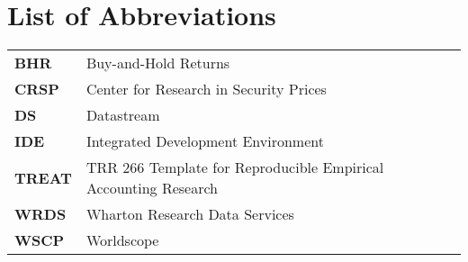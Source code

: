 \clearpage
{}
\section*{List of Abbreviations}
\setlength{\parindent}{0em}
\setcounter{page}{4}

\begin{tabular}{@{}ll}
\textbf{BHR}   & Buy-and-Hold Returns \\
\textbf{CRSP}  & Center for Research in Security Prices \\
\textbf{DS}    & Datastream \\
\textbf{IDE}   & Integrated Development Environment \\
\textbf{TREAT} & TRR 266 Template for Reproducible Empirical Accounting Research \\
\textbf{WRDS}  & Wharton Research Data Services \\
\textbf{WSCP}  & Worldscope \\
\end{tabular}

\setlength{\parindent}{4em}
\clearpage